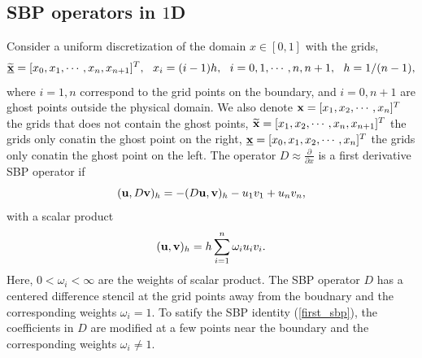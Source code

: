 \documentclass[a4paper]{article}
\newcommand{\wt}{\widetilde}
\begin{document}
\subsection{SBP operators in $1$D}
Consider a uniform discretization of the domain $x\in[0,1]$ with the grids,
\[\uline{\wt
{{\bf x}}} = [x_0,x_1,\cdots,x_n,x_{n+1}]^T,\ \  x_i = (i-1)h,\ \ i = 0,1,\cdots,n,n+1,\ \ h = 1/(n-1),\]
where $i = 1,n$ correspond to the grid points on the boundary, and $i = 0,n+1$ are ghost points outside the physical domain.
We also denote ${\bf x} = [x_1,x_2,\cdots,x_n]^T$ the grids that does not  contain the ghost points, $\wt{{\bf x}} = [x_1,x_2,\cdots,x_n,x_{n+1}]^T$ the grids only conatin the ghost point on the right, $\uline{{\bf x}} = [x_0,x_1,x_2,\cdots,x_n]^T$ the grids only conatin the ghost point on the left. The  operator $D \approx \frac{\partial }{\partial x}$ is a first derivative SBP operator if 
\begin{equation}\label{first_sbp}
({\bf u}, D{\bf v})_h = -(D{\bf u},{\bf v})_h - u_1v_1 + u_nv_n,
\end{equation}
with a scalar product
\begin{equation}\label{inner_product}
({\bf u},{\bf v})_h = h\sum_{i = 1}^{n}\omega_iu_iv_i.
\end{equation}
Here, $0<\omega_i < \infty $ are the weights of scalar product. The SBP operator $D$ has a centered difference stencil at the grid points away from the boudnary and the corresponding weights $\omega_i = 1$. To satify the SBP identity (\ref{first_sbp}), the coefficients in $D$ are  modified at a few points near the boundary and the corresponding weights $\omega_i \neq 1$.
\end{document}
